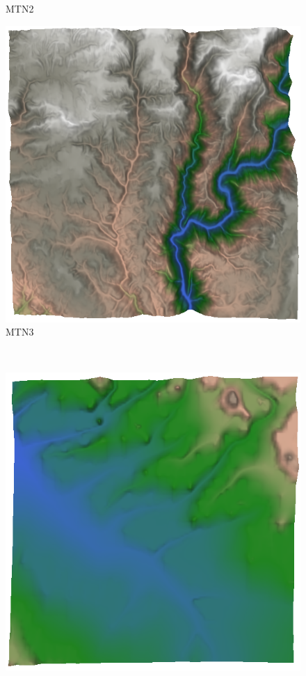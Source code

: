 \begin{figure}[t]
\begin{minipage}[b]{0.3\linewidth}
\begin{center}
MTN2
\end{center}
\end{minipage}
%
\begin{minipage}[b]{0.3\linewidth}
\begin{center}
\includegraphics[width=\linewidth]{images/mtn3_normalized.png} \\
MTN3
\end{center}
\end{minipage} \\
%
\begin{minipage}[b]{0.3\linewidth}
\begin{center}
\includegraphics[width=\linewidth]{images/hill1_normalized.png} \\

\end{center}
\end{minipage}
\end{figure}
